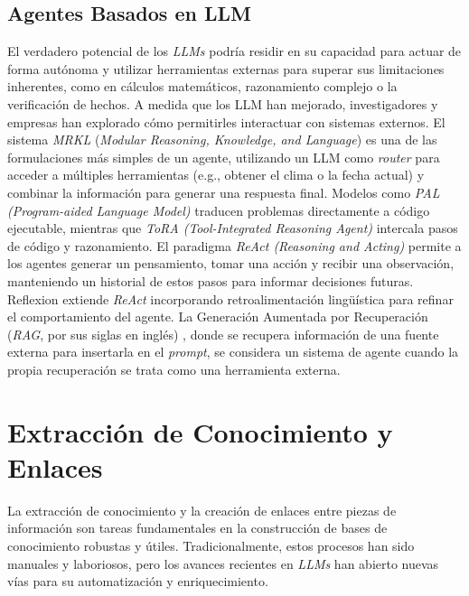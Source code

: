 \subsection{Agentes Basados en LLM}
\label{subsec:agentes_llm}
El verdadero potencial de los \textit{LLMs} podría residir en su capacidad para actuar de forma autónoma y utilizar herramientas externas para superar sus limitaciones inherentes, como en cálculos matemáticos, razonamiento complejo o la verificación de hechos. A medida que los LLM han mejorado, investigadores y empresas han explorado cómo permitirles interactuar con sistemas externos.
El sistema \textit{MRKL} (\textit{Modular Reasoning, Knowledge, and Language}) \parencite{karpasMRKLSystemsModular2022} es una de las formulaciones más simples de un agente, utilizando un LLM como \textit{router} para acceder a múltiples herramientas (e.g., obtener el clima o la fecha actual) y combinar la información para generar una respuesta final. Modelos como \textit{PAL (Program-aided Language Model)} \parencite{gaoPALProgramaidedLanguage2023} traducen problemas directamente a código ejecutable, mientras que \textit{ToRA (Tool-Integrated Reasoning Agent)} \parencite{gouToRAToolIntegratedReasoning2024} intercala pasos de código y razonamiento. El paradigma \textit{ReAct (Reasoning and Acting)} \parencite{yaoReActSynergizingReasoning2023} permite a los agentes generar un pensamiento, tomar una acción y recibir una observación, manteniendo un historial de estos pasos para informar decisiones futuras. Reflexion \parencite{shinnReflexionLanguageAgents2023} extiende \textit{ReAct} incorporando retroalimentación lingüística para refinar el comportamiento del agente. La Generación Aumentada por Recuperación (\textit{RAG}, por sus siglas en inglés) \parencite{lewisRetrievalAugmentedGenerationKnowledgeIntensive2021}, donde se recupera información de una fuente externa para insertarla en el \textit{prompt}, se considera un sistema de agente cuando la propia recuperación se trata como una herramienta externa.

\section{Extracción de Conocimiento y Enlaces}
\label{sec:extraccion_conocimiento_enlaces}
La extracción de conocimiento y la creación de enlaces entre piezas de información son tareas fundamentales en la construcción de bases de conocimiento robustas y útiles. Tradicionalmente, estos procesos han sido manuales y laboriosos, pero los avances recientes en \textit{LLMs} han abierto nuevas vías para su automatización y enriquecimiento.

